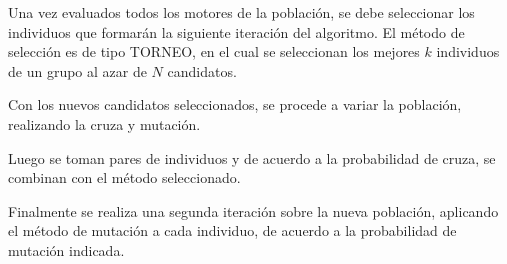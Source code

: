 





Una vez evaluados todos los motores de la población, se debe seleccionar los
individuos que formarán la siguiente iteración del algoritmo.
%
El método de selección es de tipo TORNEO, en el cual se seleccionan los mejores
$k$ individuos de un grupo al azar de $N$ candidatos.
%

Con los nuevos candidatos seleccionados, se procede a variar la población,
realizando la cruza y mutación.

Luego se toman pares de individuos y de acuerdo a la probabilidad de cruza, se
combinan con el método seleccionado.

Finalmente se realiza una segunda iteración sobre la nueva población, aplicando
el método de mutación a cada individuo, de acuerdo a la probabilidad de
mutación indicada.
